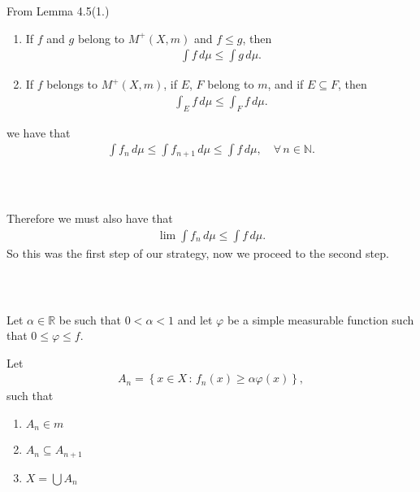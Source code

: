 \documentclass{beamer}
\numberwithin{equation}{section}
\begin{document}
\begin{frame}\frametitle{{\normalsize \secname} \\ {\large \subsecname}}
    From Lemma 4.5(1.)
    \begingroup
    \small
    \begin{lemma}
        \begin{enumerate}
            \item If $f$ and $g$ belong to $M^+(X,m)$ and $f \leq g$, then
            \begin{align}
                \int f \, d\mu \leq \int g \, d\mu.
            \end{align}
            \item If $f$ belongs to $M^+(X,m)$, if $E$, $F$ belong to $m$, and if $E\subseteq F$, then
            \begin{align}
                \int_E f \, d\mu \leq \int_F f \, d\mu.
            \end{align}
        \end{enumerate}
    \end{lemma}
    \endgroup
    we have that
    \begin{align}
        \int f_n \, d\mu \leq \int f_{n + 1} \, d\mu \leq \int f \, d\mu, \quad \forall \, n \in \mathbb{N}.
    \end{align}
\end{frame}

\begin{frame}\frametitle{{\normalsize \secname} \\ {\large \subsecname}}
    Therefore we must also have that
    \begin{align}
        \lim \int f_n \, d\mu \leq \int f \, d\mu.
    \end{align}
    So this was the first step of our strategy, now we proceed to the second step.
\end{frame}

\begin{frame}\frametitle{{\normalsize \secname} \\ {\large \subsecname}}
    Let $\alpha \in \mathbb{R}$ be such that $0 < \alpha < 1$ and let $\varphi$ be a simple measurable function such that $0 \leq \varphi \leq f$.
    
    Let
    \begin{align}
        A_n = \left\{x \in X \, : \, f_n(x) \geq \alpha \varphi(x) \right\},
    \end{align}
    such that
    \begin{enumerate}
        \item $A_n \in m$
        \item $A_n \subseteq A_{n + 1}$
        \item $X = \bigcup A_n$
    \end{enumerate}
\end{frame}
\end{document}
